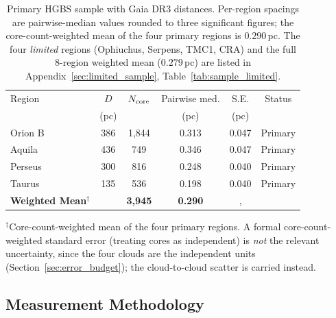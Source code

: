 \documentclass[usenatbib,twoside,twocolumn]{mnras}
\begin{document}
\begin{table}
\caption{Primary HGBS sample with Gaia DR3 distances. Per-region spacings are pairwise-median values rounded to three significant figures; the core-count-weighted mean of the four primary regions is $0.290$\,pc. The four \emph{limited} regions (Ophiuchus, Serpens, TMC1, CRA) and the full 8-region weighted mean ($0.279$\,pc) are listed in Appendix~\ref{sec:limited_sample}, Table~\ref{tab:sample_limited}.}
\label{tab:sample}
\footnotesize
\setlength{\tabcolsep}{3pt}
\begin{tabular}{lccccc}
\toprule
Region & $D$ & $N_{\rm core}$ & Pairwise med. & S.E. & Status \\
       & (pc) &  & (pc) & (pc) &  \\
\midrule
Orion B  & 386 & 1,844 & 0.313 & 0.047 & Primary \\
Aquila   & 436 & 749   & 0.346 & 0.047 & Primary \\
Perseus  & 300 & 816   & 0.248 & 0.040 & Primary \\
Taurus   & 135 & 536   & 0.198 & 0.040 & Primary \\
\midrule
\textbf{Weighted Mean}$^\dagger$ &  & \textbf{3,945} & \textbf{0.290} &, &  \\
\bottomrule
\end{tabular}
\par\vspace{2pt}
\footnotesize $^\dagger$Core-count-weighted mean of the four primary regions. A formal core-count-weighted standard error (treating cores as independent) is \emph{not} the relevant uncertainty, since the four clouds are the independent units (Section~\ref{sec:error_budget}); the cloud-to-cloud scatter is carried instead.
\end{table}

\subsection{Measurement Methodology}
\label{sec:methodology}
\end{document}
